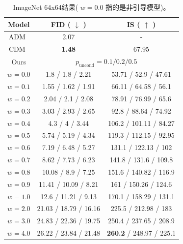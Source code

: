 \documentclass{article}
\begin{document}
 \begin{table}[!htb]
\centering\small
\begin{tabular}{c|c|c}
\toprule
Model & FID (    $\downarrow$    ) & IS (    $\uparrow$    )  \\ 
\midrule
ADM~\citep{dhariwal2021diffusion} & 2.07 & -  \\ 
CDM~\citep{ho2021cascaded} & \textbf{1.48} & 67.95  \\ 
\midrule
Ours & \multicolumn{2}{c}{    $p_\mathrm{uncond}=0.1/0.2/0.5$    }  \\ 
    $w=0.0$      & 1.8 / 1.8 / 2.21    &    53.71 / 52.9 / 47.61  \\ 
    $w=0.1$      & 1.55 / 1.62 / 1.91    &    66.11 / 64.58 / 56.1  \\ 
    $w=0.2$      & 2.04 / 2.1 / 2.08    &    78.91 / 76.99 / 65.6  \\ 
    $w=0.3$      & 3.03 / 2.93 / 2.65    &    92.8 / 88.64 / 74.92  \\ 
    $w=0.4$      & 4.3 / 4 / 3.44    &    106.2 / 101.11 / 84.27  \\ 
    $w=0.5$      & 5.74 / 5.19 / 4.34    &    119.3 / 112.15 / 92.95  \\ 
    $w=0.6$      & 7.19 / 6.48 / 5.27    &    131.1 / 122.13 / 102  \\ 
    $w=0.7$      & 8.62 / 7.73 / 6.23    &    141.8 / 131.6 / 109.8  \\ 
    $w=0.8$      & 10.08 / 8.9 / 7.25    &    151.6 / 140.82 / 116.9  \\ 
    $w=0.9$      & 11.41 / 10.09 / 8.21    &    161 / 150.26 / 124.6  \\ 
    $w=1.0$      & 12.6 / 11.21 / 9.13    &    170.1 / 158.29 / 131.1  \\ 
    $w=2.0$      & 21.03 / 18.79 / 16.16    &    225.5 / 212.98 / 183  \\ 
    $w=3.0$      & 24.83 / 22.36 / 19.75    &    250.4 / 237.65 / 208.9  \\ 
    $w=4.0$      & 26.22 / 23.84 / 21.48    &    \textbf{260.2} / 248.97 / 225.1  \\ 
\bottomrule
\end{tabular}
\caption{
ImageNet 64x64结果( $w=0.0$ 指的是非引导模型)。}
\label{table:i64}
\end{table} 
\end{document}
